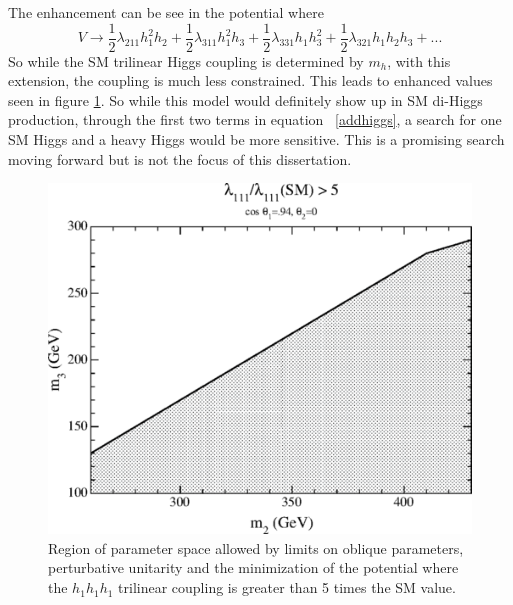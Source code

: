 The enhancement can be see in the potential where 
\begin{equation}
V \rightarrow \frac{1}{2}\lambda_{211}h_{1}^{2}h_{2} + \frac{1}{2}\lambda_{311}h_{1}^{2}h_{3} + \frac{1}{2}\lambda_{331}h_{1}h_{3}^{2} + \frac{1}{2}\lambda_{321}h_{1}h_{2}h_{3} + . . .
\label{addhiggs}
\end{equation}
So while the SM trilinear Higgs coupling is determined by ${m_{h}}$, with this extension, the coupling is much less constrained. This leads to enhanced values seen in figure \ref{fig:CHS8}. So while this model would definitely show up in SM di-Higgs production, through the first two terms in equation ~\ref{addhiggs}, a search for one SM Higgs and a heavy Higgs would be more sensitive. This is a promising search moving forward but is not the focus of this dissertation.
\begin{figure}[h]
\begin{center}
\includegraphics[scale=0.65]{figures/CompHiggsSing_Fig8}
\caption[Allowed regions of parameter space with enhanced trilinear coupling]{Region of parameter space allowed by limits on oblique parameters, perturbative unitarity and the minimization of the potential where the ${h_{1}h_{1}h_{1}}$ trilinear coupling is greater than 5 times the SM value.}
\label{fig:CHS8}
\end{center}
\end{figure}

